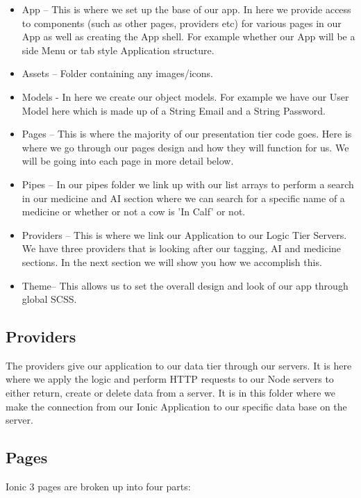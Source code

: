 \documentclass[12pt,a4paper,oneside,openany]{book}
\begin{document}
\begin{itemize}
    \item App – This is where we set up the base of our app. In here we provide access to components (such as other pages, providers etc) for various pages in our App as well as creating the App shell. For example whether our App will be a side Menu or tab style Application structure.
    \item Assets – Folder containing any images/icons.
    \item Models - In here we create our object models. For example we have our User Model here which is made up of a String Email and a String Password.
    \item Pages – This is where the majority of our presentation tier code goes. Here is where we go through our pages design and how they will function for us. We will be going into each page in more detail below.
    \item Pipes – In our pipes folder we link up with our list arrays to perform a search in our medicine and AI section where we can search for a specific name of a medicine or whether or not a cow is 'In Calf' or not.
    \item Providers – This is where we link our Application to our Logic Tier Servers. We have three providers that is looking after our tagging, AI and medicine sections. In the next section we will show you how we accomplish this.
    \item Theme– This allows us to set the overall design and look of our app through global SCSS.
\end{itemize}

\subsection{Providers}
The providers give our application to our data tier through our servers. It is here where we apply the logic and perform HTTP requests to our Node servers to either return, create or delete data from a server. It is in this folder where we make the connection from our Ionic Application to our specific data base on the server.

\subsection{Pages}
Ionic 3 pages are broken up into four parts:
\end{document}
